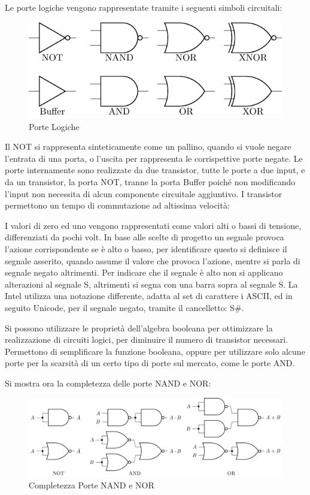 \documentclass{article}
\numberwithin{equation}{subsection}
\begin{document}
Le porte logiche vengono rappresentate tramite i seguenti simboli circuitali:
\begin{figure}[H]%
    \centering
    \includegraphics{porte-logiche.pdf}%
    \caption{Porte Logiche}%
\end{figure}
Il NOT si rappresenta sinteticamente come un pallino, quando si vuole negare l'entrata di una porta, o l'uscita per rappresenta le corrispettive porte negate. 
Le porte internamente sono realizzate da due transistor, tutte le porte a due input, e da un transistor, la porta NOT, tranne la porta Buffer poiché non modificando l'input non necessita di alcun componente circuitale 
aggiuntivo. I transistor permettono un tempo di commutazione ad altissima velocità:  


I valori di zero ed uno vengono rappresentati come valori alti o bassi di tensione, differenziati da pochi volt. In base alle scelte di progetto un segnale provoca l'azione corrispondente se è alto o basso, per 
identificare questo si definisce il segnale asserito, quando assume il valore che provoca l'azione, mentre si parla di segnale negato altrimenti. 
Per indicare che il segnale è alto non si applicano alterazioni al segnale S, altrimenti si segna con una barra sopra al segnale $\overline{\mathrm{S}}$. La Intel utilizza una notazione differente, adatta al 
set di carattere i ASCII, ed in seguito Unicode, per il segnale negato, tramite il cancelletto: S\#.  



Si possono utilizzare le proprietà dell'algebra booleana per ottimizzare la realizzazione di circuiti logici, per diminuire il numero di transistor necessari. Permettono di semplificare la funzione booleana, oppure 
per utilizzare solo alcune porte per la scarsità di un certo tipo di porte sul mercato, come le porte AND. 

Si mostra ora la completezza delle porte NAND e NOR:
\begin{figure}[H]%
    \centering%
    \includegraphics[scale=0.8]{completezza-nand-nor.pdf}%
    \caption{Completezza Porte NAND e NOR}%
\end{figure}
\end{document}
